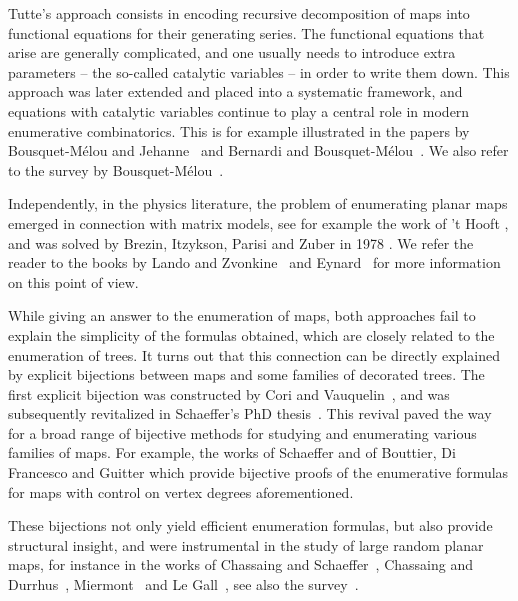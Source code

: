 \documentclass[11pt,reqno,tbtags]{amsart}
\numberwithin{equation}{section}
\numberwithin{theo}{section}
\theoremstyle{definition}
\begin{document}
Tutte's approach consists in encoding recursive decomposition of maps into functional equations for their generating series. The functional equations that arise are generally complicated, and one usually needs to introduce extra parameters -- the so-called catalytic variables -- in order to write them down. This approach was later extended and placed into a systematic framework, and equations with catalytic variables continue to play a central role in modern enumerative combinatorics. This is for example illustrated in the papers by Bousquet-Mélou and Jehanne~\cite{BousquetMelouJehanne} and Bernardi and Bousquet-Mélou~\cite{BernardiBousquetMelou}. We also refer to the survey by Bousquet-Mélou~\cite{BousquetMelou06}.

Independently, in the physics literature, the problem of enumerating planar maps emerged in connection with matrix models, see for example the work of 't Hooft \cite{THooft74}, and was solved by Brezin, Itzykson, Parisi and Zuber in 1978 \cite{BrezinItzyksonParisiZuber}. We refer the reader to the books by Lando and Zvonkine~\cite{LandoZvonkin} and Eynard~\cite{Eynard16}  for more information on this point of view. 

While giving an answer to the enumeration of maps, both approaches fail to explain the simplicity of the formulas obtained, which are closely related to the enumeration of trees. It turns out that this connection can be directly explained by explicit bijections between maps and some families of decorated trees. The first explicit bijection was constructed by Cori and Vauquelin~\cite{CoriVauquelin}, and was subsequently revitalized in Schaeffer’s PhD thesis~\cite{SchaefferPhd}. This revival paved the way for a broad range of bijective methods for studying and enumerating various families of maps. For example, the works of Schaeffer \cite{Scha97} and of Bouttier, Di Francesco and Guitter \cite{BouttierDiFrancescoGuitter_Census, BouttierDiFrancescoGuitter_Mobiles} which provide bijective proofs of the enumerative formulas for maps with control on vertex degrees aforementioned.

These bijections not only yield efficient enumeration formulas, but also provide structural insight, and were instrumental in the study of large random planar maps, for instance in the works of 
Chassaing and Schaeffer~\cite{ChassaingSchaeffer04}, Chassaing and  Durrhus~\cite{ChassaingDurhuus06}, Miermont~\cite{Miermont_Brownian} and Le Gall~\cite{LeGall_Uniqueness}, see also the survey~\cite{LeGallMiermont12}.
\end{document}
